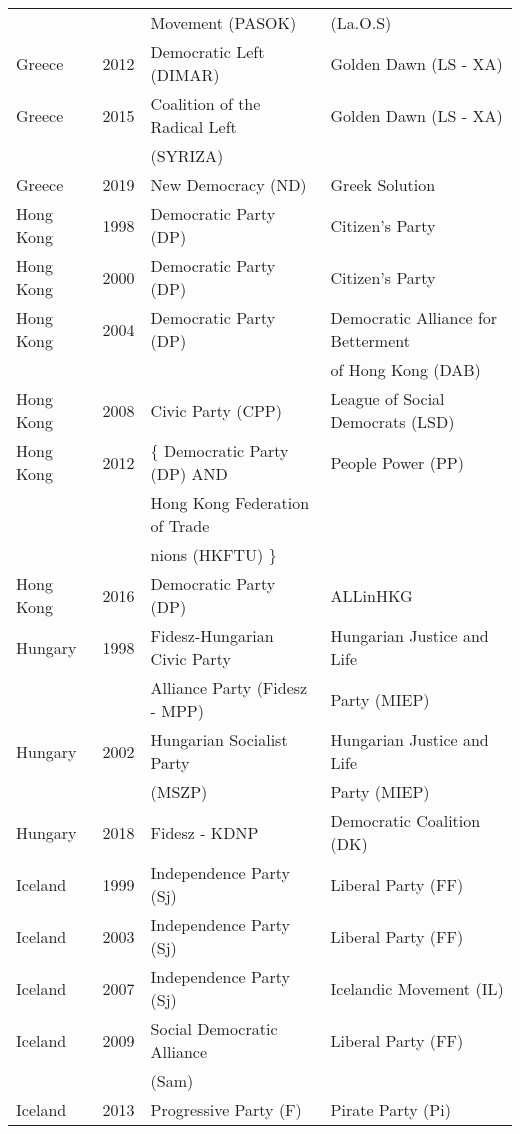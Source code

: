 {\begin{longtable}{|l|c|l|l|}
          &    & Movement (PASOK) &   (La.O.S)\\ 
  Greece & 2012 & Democratic Left (DIMAR) &  Golden Dawn (LS - XA) \\ 
  Greece & 2015 & Coalition of the Radical Left   &Golden Dawn (LS - XA)   \\ 
          &     &   (SYRIZA) &   \\ 
  Greece & 2019 &  New Democracy (ND) &  Greek Solution\\ 
  Hong Kong & 1998 &   Democratic Party (DP) &   Citizen's Party \\ 
  Hong Kong & 2000 &   Democratic Party (DP) &   Citizen's Party \\ 
  Hong Kong & 2004 &   Democratic Party (DP) &   Democratic Alliance for Betterment  \\ 
        &    &     &     of Hong Kong (DAB) \\ 
  Hong Kong & 2008 &   Civic Party (CPP) &   League of Social Democrats (LSD) \\ 
  Hong Kong & 2012 &  $\{$ Democratic Party (DP) AND   &   People Power (PP) \\ 
       &    &    Hong Kong Federation of Trade  &     \\ 
       &    &     nions (HKFTU) $\}$ &     \\ 
  Hong Kong & 2016 &   Democratic Party (DP) &   ALLinHKG   \\ 
  Hungary & 1998 &   Fidesz-Hungarian Civic Party  &   Hungarian Justice and Life   \\ 
   &   &   Alliance Party (Fidesz - MPP) &     Party (MIEP) \\ 
  Hungary & 2002 &   Hungarian Socialist Party   &   Hungarian Justice and Life  \\ 
           &   &   (MSZP) &    Party (MIEP) \\ 
  Hungary & 2018 &   Fidesz - KDNP   &   Democratic Coalition (DK) \\ 
  Iceland & 1999 &   Independence Party (Sj) &   Liberal Party (FF) \\ 
  Iceland & 2003 &   Independence Party (Sj) &   Liberal Party (FF) \\ 
  Iceland & 2007 &   Independence Party (Sj) &   Icelandic Movement (IL) \\ 
  Iceland & 2009 &        Social Democratic Alliance     &   Liberal Party (FF) \\ 
          &   &         (Sam)   &     \\ 
  Iceland & 2013 &   Progressive Party (F) &   Pirate Party (Pi) \\ 

\end{longtable}}
